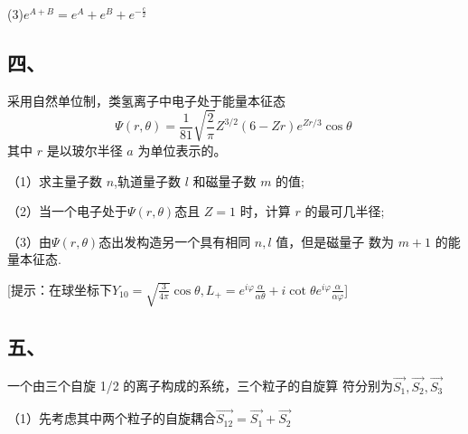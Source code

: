 (3)$e^{A+B} =e^A+e^B+e^{-\frac{c}{2}}$ 
\subsection{四、}

采用自然单位制，类氢离子中电子处于能量本征态
$$\Psi(r,\theta)=\frac{1}{81}\sqrt{\frac{2}{\pi}}Z^{3/2}(6-Zr)e^{Zr/3}\cos\theta~$$
其中 $r$ 是以玻尔半径 $a$ 为单位表示的。

（1）求主量子数 $n$,轨道量子数 $l$ 和磁量子数 $m$ 的值;

（2）当一个电子处于$\Psi(r,\theta)$态且 $Z=1$ 时，计算 $r$ 的最可几半径;

（3）由$\Psi(r,\theta)$态出发构造另一个具有相同 $n,l$ 值，但是磁量子
数为 $m+1$ 的能量本征态.

[提示：在球坐标下$Y_{10}=\sqrt{\frac{3}{4 \pi}}\cos\theta,L_+=e^{i\varphi}\frac{\alpha}{\alpha\theta}+i\cot\theta e^{i\varphi}\frac{\alpha}{\alpha\varphi}$]
\subsection{五、}
一个由三个自旋 1/2 的离子构成的系统，三个粒子的自旋算
符分别为$\vec{S_1},\vec{S_2},\vec{S_3}$

（1）先考虑其中两个粒子的自旋耦合$\vec{S_{12}}=\vec{S_1}+\vec{S_2}$